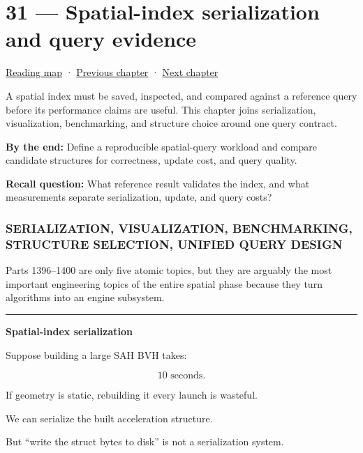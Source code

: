 \hypertarget{06-engine-ii-ch031}{}
\chapter{31 --- Spatial-index serialization and query evidence}\label{06-engine-ii-ch031-spatial-index-serialization-and-query-evidence}

\hyperref[volume-reading-map]{Reading map} · \hyperref[06-engine-ii-ch030-depth-projection-and-shadow-map-precision]{Previous chapter} · \hyperref[06-engine-ii-ch032-terrain-materials-and-image-composition]{Next chapter}

A spatial index must be saved, inspected, and compared against a reference query before its performance claims are useful. This chapter joins serialization, visualization, benchmarking, and structure choice around one query contract.

\textbf{By the end:} Define a reproducible spatial-query workload and compare candidate structures for correctness, update cost, and query quality.

\textbf{Recall question:} What reference result validates the index, and what measurements separate serialization, update, and query costs?

\subsection{SERIALIZATION, VISUALIZATION, BENCHMARKING, STRUCTURE SELECTION, UNIFIED QUERY DESIGN}\label{06-engine-ii-ch031-serialization-visualization-benchmarking-structure-selection-unified-query-design}

Parts 1396--1400 are only five atomic topics, but they are arguably the most important engineering topics of the entire spatial phase because they turn algorithms into an engine subsystem.

\begin{center}\rule{0.5\linewidth}{0.5pt}\end{center}

\textbf{Spatial-index serialization}

Suppose building a large SAH BVH takes:

\[
10\text{ seconds}.
\]

If geometry is static, rebuilding it every launch is wasteful.

We can serialize the built acceleration structure.

But ``write the struct bytes to disk'' is not a serialization system.

